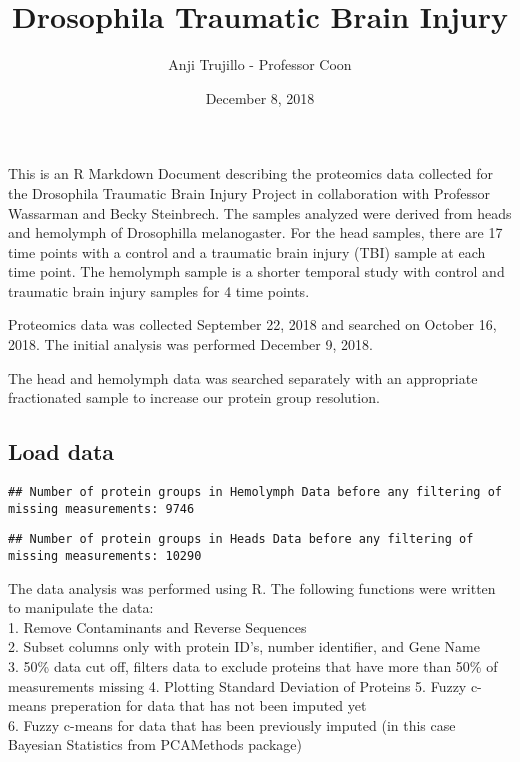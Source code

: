 \documentclass[]{article}
\title{Drosophila Traumatic Brain Injury}
\author{Anji Trujillo - Professor Coon}
\date{December 8, 2018}
\begin{document}
\maketitle

This is an R Markdown Document describing the proteomics data collected
for the Drosophila Traumatic Brain Injury Project in collaboration with
Professor Wassarman and Becky Steinbrech. The samples analyzed were
derived from heads and hemolymph of Drosophilla melanogaster. For the
head samples, there are 17 time points with a control and a traumatic
brain injury (TBI) sample at each time point. The hemolymph sample is a
shorter temporal study with control and traumatic brain injury samples
for 4 time points.

Proteomics data was collected September 22, 2018 and searched on October
16, 2018. The initial analysis was performed December 9, 2018.

The head and hemolymph data was searched separately with an appropriate
fractionated sample to increase our protein group resolution.

\subsection{Load data}\label{load-data}

\begin{verbatim}
## Number of protein groups in Hemolymph Data before any filtering of missing measurements: 9746
\end{verbatim}

\begin{verbatim}
## Number of protein groups in Heads Data before any filtering of missing measurements: 10290
\end{verbatim}

The data analysis was performed using R. The following functions were
written to manipulate the data:\\
1. Remove Contaminants and Reverse Sequences\\
2. Subset columns only with protein ID's, number identifier, and Gene
Name\\
3. 50\% data cut off, filters data to exclude proteins that have more
than 50\% of measurements missing 4. Plotting Standard Deviation of
Proteins 5. Fuzzy c-means preperation for data that has not been imputed
yet\\
6. Fuzzy c-means for data that has been previously imputed (in this case
Bayesian Statistics from PCAMethods package)
\end{document}
